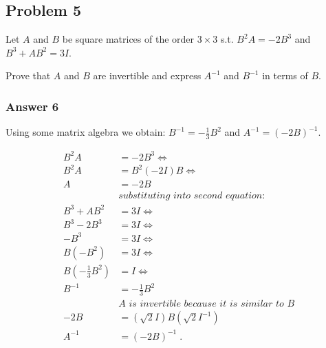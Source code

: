 \documentclass[11pt]{article}
\begin{document}
\subsection{Problem 5}
\label{sec:orgheadline11}
Let \(A\) and \(B\) be square matrices of the order \(3 \times 3\) s.t. \(B^2A = -2B^3\)
and \(B^3 + AB^2 = 3I\).

Prove that \(A\) and \(B\) are invertible and express \(A^{-1}\) and \(B^{-1}\) in
terms of \(B\).

\subsubsection{Answer 6}
\label{sec:orgheadline10}
Using some matrix algebra we obtain: \(B^{-1} = -\frac{1}{3}B^2\) and \(A^{-1}
    = (-2B)^{-1}\).

\begin{align*}
  B^2A &= -2B^3 \iff \\
  B^2A &= B^2(-2I)B \iff \\
  A &= -2B \\
  &\textit{substituting into second equation:} \\
  B^3 + AB^2 &= 3I \iff \\
  B^3 - 2B^3 &= 3I \iff \\
  -B^3 &= 3I \iff \\
  B(-B^2) &= 3I \iff \\
  B(-\frac{1}{3}B^2) &= I \iff \\
  B^{-1} &= -\frac{1}{3}B^2 \\
  &\textit{$A$ is invertible because it is similar to $B$} \\
  -2B &= (\sqrt{2}I)B(\sqrt{2}I^{-1}) \\
  A^{-1} &= (-2B)^{-1} \;.
\end{align*}
\end{document}
